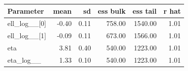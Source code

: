 \begin{table}[htbp]
\centering
{}
\label{tab:hsgp_ca_params}
\small
\begin{tabular}{lrrrrr}
\toprule
\textbf{Parameter} & \textbf{mean} & \textbf{sd} & \textbf{ess bulk} & \textbf{ess tail} & \textbf{r hat} \\
\midrule
ell\_log\_\_[0] & -0.40 & 0.11 & 758.00 & 1540.00 & 1.01 \\
ell\_log\_\_[1] & -0.09 & 0.11 & 673.00 & 1566.00 & 1.01 \\
eta & 3.81 & 0.40 & 540.00 & 1223.00 & 1.01 \\
eta\_log\_\_ & 1.33 & 0.10 & 540.00 & 1223.00 & 1.01 \\
\bottomrule
\end{tabular}
\end{table}
